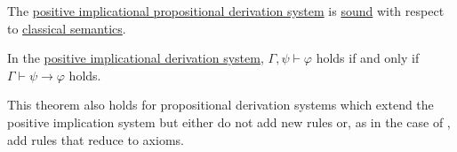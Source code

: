 \begin{proposition}\label{thm:soundness_of_positive_implicational_propositional_derivation_system}
  The \hyperref[def:positive_implicational_propositional_derivation_system]{positive implicational propositional derivation system} is \hyperref[def:derivability_and_satisfiability/soundness]{sound} with respect to \hyperref[def:propositional_semantics]{classical semantics}.
\end{proposition}

\begin{theorem}\label{thm:propositional_syntactic_deduction_theorem}
  In the \hyperref[def:positive_implicational_propositional_derivation_system]{positive implicational derivation system}, \( \Gamma, \psi \vdash \varphi \) holds if and only if \( \Gamma \vdash \psi \rightarrow \varphi \) holds.

  This theorem also holds for propositional derivation systems which extend the positive implication system but either do not add new rules or, as in the case of , add rules that reduce to axioms.
\end{theorem}
